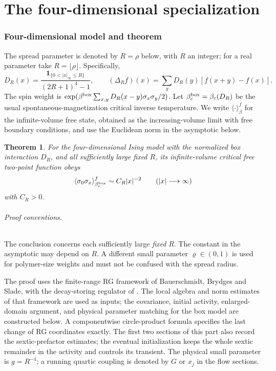 \documentclass[11pt]{article}
\newtheorem{theorem}{Theorem}
\begin{document}
\part{The four-dimensional specialization}\label{part:fourdim}
\section*{Four-dimensional model and theorem}
The spread parameter is denoted by \(R=\rho\) below,
with \(R\) an integer; for a real parameter take \(R=\lfloor\rho\rfloor\).
Specifically,
\[
 D_R(x)=\frac{\boldsymbol1_{\{0<|x|_\infty\le R\}}}{(2R+1)^4-1},
 \qquad (\Delta_R f)(x)=\sum_yD_R(y)[f(x+y)-f(x)].
\]
The spin weight is \(\exp(\beta^{\rm box}\sum_{x,y}D_R(x-y)\sigma_x\sigma_y/2)\).
Let \(\beta_c^{\rm box}=\beta_c(D_R)\) be the usual
spontaneous-magnetization critical inverse temperature. We write
\(\langle\cdot\rangle^f_\beta\) for the infinite-volume free state,
obtained as the increasing-volume limit with free boundary conditions,
and use the Euclidean norm in the asymptotic below.

\begin{theorem}\label{thm:main}
For the four-dimensional Ising model with the normalized
box interaction \(D_R\), and all sufficiently large fixed
\(R\), its infinite-volume critical free two-point function obeys
\[
 \langle\sigma_0\sigma_x\rangle^f_{\beta_c^{\rm box}}
       \sim C_R |x|^{-2}
       \qquad (|x|\longrightarrow\infty)
\]
with \(C_R>0\).
\end{theorem}

\paragraph{Proof conventions.}
The conclusion concerns each sufficiently large \emph{fixed} \(R\).
The constant in the asymptotic may depend on \(R\). A different small
parameter \(\varrho\in(0,1)\) is used for polymer-size weights and
must not be confused with the spread radius.

The proof uses the finite-range RG framework of Bauerschmidt, Brydges
and Slade, with the decay-storing regulator of \cite{ParkMap,ParkTorus}.
The local algebra and norm estimates of that framework are used as
inputs; the covariance, initial activity, enlarged-domain argument,
and physical parameter matching for the box model are constructed
below. A componentwise circle-product formula specifies the last
change of RG coordinates exactly. The first two sections of this part also record
the sextic-prefactor estimates; the eventual initialization keeps the
whole sextic remainder in the activity and controls its transient.
The physical small parameter is \(g=R^{-4}\); a running quartic
coupling is denoted by \(G\) or \(x_j\) in the flow sections.
\end{document}
